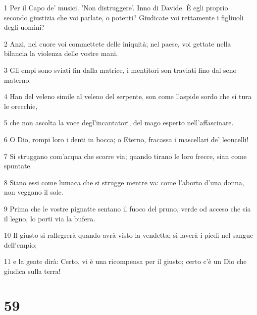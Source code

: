 \par 1 Per il Capo de' musici. 'Non distruggere'. Inno di Davide. È egli proprio secondo giustizia che voi parlate, o potenti? Giudicate voi rettamente i figliuoli degli uomini?
\par 2 Anzi, nel cuore voi commettete delle iniquità; nel paese, voi gettate nella bilancia la violenza delle vostre mani.
\par 3 Gli empi sono sviati fin dalla matrice, i mentitori son traviati fino dal seno materno.
\par 4 Han del veleno simile al veleno del serpente, son come l'aspide sordo che si tura le orecchie,
\par 5 che non ascolta la voce degl'incantatori, del mago esperto nell'affascinare.
\par 6 O Dio, rompi loro i denti in bocca; o Eterno, fracassa i mascellari de' leoncelli!
\par 7 Si struggano com'acqua che scorre via; quando tirano le loro frecce, sian come spuntate.
\par 8 Siano essi come lumaca che si strugge mentre va: come l'aborto d'una donna, non veggano il sole.
\par 9 Prima che le vostre pignatte sentano il fuoco del pruno, verde od acceso che sia il legno, lo porti via la bufera.
\par 10 Il giusto si rallegrerà quando avrà visto la vendetta; si laverà i piedi nel sangue dell'empio;
\par 11 e la gente dirà: Certo, vi è una ricompensa per il giusto; certo c'è un Dio che giudica sulla terra!

\chapter{59}

